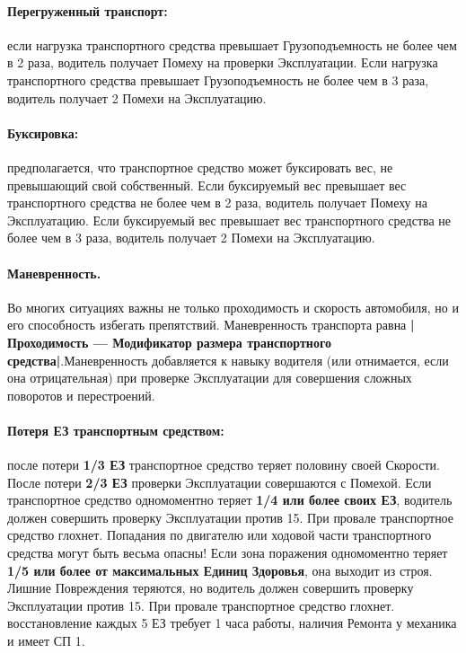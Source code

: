 \paragraph{Перегруженный транспорт:} если нагрузка транспортного средства превышает Грузоподъемность не более чем в 2 раза, водитель получает Помеху на проверки Эксплуатации. Если нагрузка транспортного средства превышает Грузоподъемность не более чем в 3 раза, водитель получает 2 Помехи на Эксплуатацию.
\paragraph{Буксировка:} предполагается, что транспортное средство может буксировать вес, не превышающий свой собственный. Если буксируемый вес превышает вес транспортного средства не более чем в 2 раза, водитель получает Помеху на Эксплуатацию. Если буксируемый вес превышает вес транспортного средства не более чем в 3 раза, водитель получает 2 Помехи на Эксплуатацию.
\paragraph{Маневренность.} Во многих ситуациях важны не только проходимость и скорость автомобиля, но и его способность избегать препятствий. Маневренность транспорта равна \textbf{|Проходимость — Модификатор размера транспортного средства|}.Маневренность добавляется к навыку
водителя (или отнимается, если она отрицательная) при проверке Эксплуатации для совершения сложных поворотов и перестроений.
\paragraph{Потеря ЕЗ транспортным средством:} после потери \textbf{1/3 ЕЗ}
транспортное средство теряет половину своей Скорости. После
потери \textbf{2/3 ЕЗ} проверки Эксплуатации совершаются с Помехой.
\newline
Если транспортное средство одномоментно теряет \textbf{1/4 или более своих ЕЗ}, водитель должен совершить проверку Эксплуатации против 15. При провале транспортное средство глохнет.
\newline
Попадания по двигателю или ходовой части транспортного средства могут быть весьма опасны! Если зона поражения одномоментно теряет \textbf{1/5 или более от максимальных Единиц Здоровья}, она выходит из строя. Лишние Повреждения теряются, но водитель должен совершить проверку Эксплуатации против 15. При провале транспортное средство глохнет.
 восстановление каждых 5 ЕЗ требует 1 часа работы, наличия Ремонта у механика и имеет СП 1.

